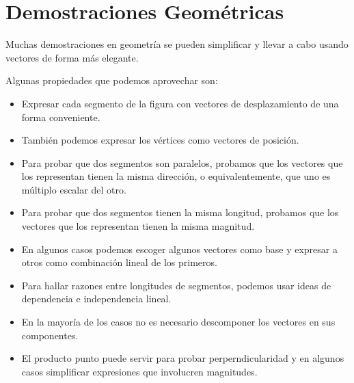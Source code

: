\documentclass[12pt, fleqn]{report}                             %
\theoremstyle{break}                                            %
\begin{document}
        


        \clearpage
        \section{Demostraciones Geométricas}
        
            Muchas demostraciones en geometría se pueden simplificar y llevar a cabo usando
            vectores de forma más elegante.

            Algunas propiedades que podemos aprovechar son:
            \begin{itemize}
                \item 
                    Expresar cada segmento de la figura con vectores de desplazamiento de una forma conveniente.
                \item
                    También podemos expresar los vértices como vectores de posición.
                \item
                    Para probar que dos segmentos son paralelos, probamos que los vectores que los representan
                    tienen la misma dirección, o equivalentemente, que uno es múltiplo escalar del otro.
                \item 
                    Para probar que dos segmentos tienen la misma longitud, probamos que los vectores que
                    los representan tienen la misma magnitud.
                \item
                    En algunos casos podemos escoger algunos vectores como base y expresar a otros como
                    combinación lineal de los primeros.
                \item
                    Para hallar razones entre longitudes de segmentos, podemos usar ideas de dependencia
                    e independencia lineal.
                \item
                    En la mayoría de los casos no es necesario descomponer los vectores en sus componentes.
                \item
                    El producto punto puede servir para probar perperndicularidad y en algunos casos
                    simplificar expresiones que involucren magnitudes.
            \end{itemize}
        
\end{document}
